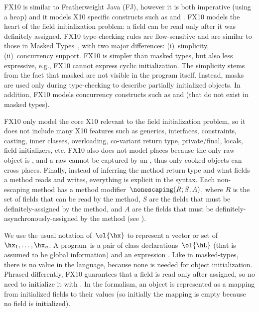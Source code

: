 FX10 is similar to Featherweight Java (FJ), however it is both imperative (using a heap) and it
    models X10 specific constructs such as \finish and \async.
FX10 models the heart of the field initialization problem:
    a field can be read only after it  was definitely assigned.
FX10 type-checking rules are flow-sensitive and are similar to those in Masked Types~\cite{XinQi:2009},
    with two major differences:
    (i)~simplicity,
    (ii)~concurrency support.
FX10 is simpler than masked types, but also less expressive, e.g., FX10 cannot express cyclic initialization.
The simplicity stems from the fact that masked are not visible in the program itself.
Instead, masks are used only during type-checking to describe partially initialized objects.
In addition, FX10 models concurrency constructs such as \finish and \async (that do not exist in masked types).

FX10 only model the core X10 relevant to the field initialization problem,
    so it does not include many X10 features such as
    generics, interfaces, constraints, casting, inner classes, overloading, co-variant return type, private/final,
    locals, field initializers, etc.
FX10 also does not model places because the only raw object is \this,
        and a raw \this cannot be captured by an ,
        thus only cooked objects can cross places.
Finally, instead of inferring the method return type and what fields a method reads and writes,
    everything is explicit in the syntax.
Each non-escaping method has a method modifier~$\nonescaping(R;S;A)$, where
            $R$ is the set of fields that can be read by the method,
                $S$ are the fields that must be definitely-assigned by the method,
                and $A$ are the fields that must be definitely-asynchronously-assigned by the method
                (see ).

We use the usual notation of~$\ol{\hx}$ to represent a vector or set of~$\hx_1, \ldots,\hx_n$.
A program~\hP is a pair of class declarations~$\ol{\hL}$ (that is assumed to be global information)
    and an expression \he.
Like in masked-types, there is no \hnull value in the language, because none is needed for object initialization.
Phrased differently,
    FX10 guarantees that a field is read only after assigned, so no need to initialize it with \hnull.
In the formalism, an object is represented as a mapping from initialized fields to their values
    (so initially the mapping is empty because no field is initialized).

